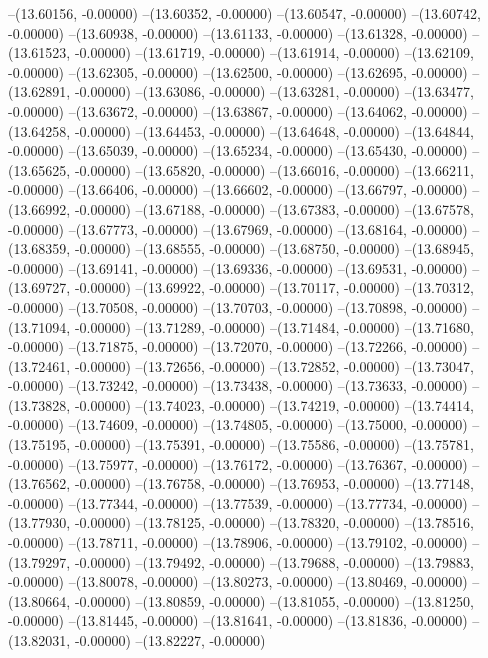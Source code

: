 --(13.60156, -0.00000)
--(13.60352, -0.00000)
--(13.60547, -0.00000)
--(13.60742, -0.00000)
--(13.60938, -0.00000)
--(13.61133, -0.00000)
--(13.61328, -0.00000)
--(13.61523, -0.00000)
--(13.61719, -0.00000)
--(13.61914, -0.00000)
--(13.62109, -0.00000)
--(13.62305, -0.00000)
--(13.62500, -0.00000)
--(13.62695, -0.00000)
--(13.62891, -0.00000)
--(13.63086, -0.00000)
--(13.63281, -0.00000)
--(13.63477, -0.00000)
--(13.63672, -0.00000)
--(13.63867, -0.00000)
--(13.64062, -0.00000)
--(13.64258, -0.00000)
--(13.64453, -0.00000)
--(13.64648, -0.00000)
--(13.64844, -0.00000)
--(13.65039, -0.00000)
--(13.65234, -0.00000)
--(13.65430, -0.00000)
--(13.65625, -0.00000)
--(13.65820, -0.00000)
--(13.66016, -0.00000)
--(13.66211, -0.00000)
--(13.66406, -0.00000)
--(13.66602, -0.00000)
--(13.66797, -0.00000)
--(13.66992, -0.00000)
--(13.67188, -0.00000)
--(13.67383, -0.00000)
--(13.67578, -0.00000)
--(13.67773, -0.00000)
--(13.67969, -0.00000)
--(13.68164, -0.00000)
--(13.68359, -0.00000)
--(13.68555, -0.00000)
--(13.68750, -0.00000)
--(13.68945, -0.00000)
--(13.69141, -0.00000)
--(13.69336, -0.00000)
--(13.69531, -0.00000)
--(13.69727, -0.00000)
--(13.69922, -0.00000)
--(13.70117, -0.00000)
--(13.70312, -0.00000)
--(13.70508, -0.00000)
--(13.70703, -0.00000)
--(13.70898, -0.00000)
--(13.71094, -0.00000)
--(13.71289, -0.00000)
--(13.71484, -0.00000)
--(13.71680, -0.00000)
--(13.71875, -0.00000)
--(13.72070, -0.00000)
--(13.72266, -0.00000)
--(13.72461, -0.00000)
--(13.72656, -0.00000)
--(13.72852, -0.00000)
--(13.73047, -0.00000)
--(13.73242, -0.00000)
--(13.73438, -0.00000)
--(13.73633, -0.00000)
--(13.73828, -0.00000)
--(13.74023, -0.00000)
--(13.74219, -0.00000)
--(13.74414, -0.00000)
--(13.74609, -0.00000)
--(13.74805, -0.00000)
--(13.75000, -0.00000)
--(13.75195, -0.00000)
--(13.75391, -0.00000)
--(13.75586, -0.00000)
--(13.75781, -0.00000)
--(13.75977, -0.00000)
--(13.76172, -0.00000)
--(13.76367, -0.00000)
--(13.76562, -0.00000)
--(13.76758, -0.00000)
--(13.76953, -0.00000)
--(13.77148, -0.00000)
--(13.77344, -0.00000)
--(13.77539, -0.00000)
--(13.77734, -0.00000)
--(13.77930, -0.00000)
--(13.78125, -0.00000)
--(13.78320, -0.00000)
--(13.78516, -0.00000)
--(13.78711, -0.00000)
--(13.78906, -0.00000)
--(13.79102, -0.00000)
--(13.79297, -0.00000)
--(13.79492, -0.00000)
--(13.79688, -0.00000)
--(13.79883, -0.00000)
--(13.80078, -0.00000)
--(13.80273, -0.00000)
--(13.80469, -0.00000)
--(13.80664, -0.00000)
--(13.80859, -0.00000)
--(13.81055, -0.00000)
--(13.81250, -0.00000)
--(13.81445, -0.00000)
--(13.81641, -0.00000)
--(13.81836, -0.00000)
--(13.82031, -0.00000)
--(13.82227, -0.00000)
